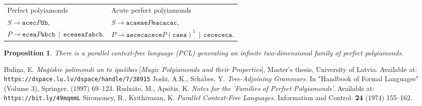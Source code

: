 \documentclass[a4paper,12pt]{article}
\newtheorem{proposition} [theorem] {\bf Proposition}
\begin{document}
\noindent
\begin{tabular}{ |l|l| } 
\hline
Perfect polyiamonds & Acute perfect polyiamonds \\ 
$S \rightarrow \mathtt{acec}P\mathtt{db}$, & 
$S \rightarrow \mathtt{acaeae}P\mathtt{eacacac}$, \\ 
$P \rightarrow \mathtt{ecea}P\mathtt{abcb} \,\mid\, \mathtt{eceaeafabcb}.$ & 
$P \rightarrow \mathtt{aececacece}P(\mathtt{caea})^5 \,\mid\, \mathtt{cecececa}.$\\ 
\hline
\end{tabular}



\begin{proposition}
There is a {\em parallel context-free language (PCL)}\cite{Siromoney1974} generating an infinite two-dimensional family of perfect polyiamonds.
\end{proposition}



\begin{thebibliography}{10}

Buliņa, E. \textit{Maģiskie polimondi un to īpašības} [{\it Magic Polyiamonds and their Properties}], Master's thesis, University of Latvia. Available at: {\tt https://dspace.lu.lv/dspace/handle/7/38915}
Joshi, A.K., Schabes, Y.
{\it Tree-Adjoining Grammars.}
In "Handbook of Formal Languages" (Volume 3), Springer, (1997) 69--123.
Rudzāte, M., Apsītis, K.
{\it Notes for the 'Families of Perfect Polyiamonds'.} 
Available at: {\tt https://bit.ly/49mqmmL}
Siromoney, R., Krithivasan, K.
{\it Parallel Context-Free Languages.}
Information and Control. {\bf 24} (1974) 155--162. 

\end{thebibliography}
\end{document}
